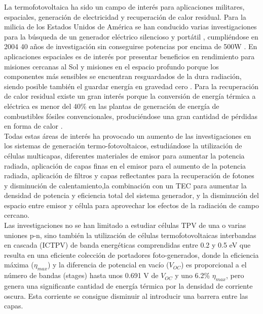La termofotovoltaica ha sido un campo de interés para aplicaciones militares, espaciales, generación de electricidad y recuperación de calor residual. Para la milicia de los Estados Unidos de América se han conducido varias investigaciones para la búsqueda de un generador eléctrico silencioso y portátil \cite{military_TPV}, cumpliéndose en 2004 40 años de investigación sin conseguirse potencias por encima de 500W \cite{military_TPV_40Years}. En aplicaciones espaciales es de interés por presentar beneficios en rendimiento para misiones cercanas al Sol y misiones en el espacio profundo porque los componentes más sensibles se encuentran resguardados de la dura radiación, siendo posible también el guardar energía en gravedad cero \cite{TPV_space_applications}. Para la recuperación de calor residual existe un gran interés porque la conversión de energía térmica a eléctrica es menor del 40\% en las plantas de generación de energía de combustibles fósiles convencionales, produciéndose una gran cantidad de pérdidas en forma de calor \cite{wasteHeat_TPV}.\\

Todas estas áreas de interés ha provocado un aumento de las investigaciones en los sistemas de generación termo-fotovoltaicos, estudiándose la utilización de células multicapas, diferentes materiales de emisor para aumentar la potencia radiada, aplicación de capas finas en el emisor para el aumento de la potencia radiada\cite{doi:Near_field_ThinFilm}, aplicación de filtros \cite{multiLayerFilters} y capas reflectantes para la recuperación de fotones y disminución de calentamiento\cite{thermoionic_TPV_NF},la combinación con un TEC para aumentar la densidad de potencia y eficiencia total del sistema generador\cite{thermoionic_TPV_NF,progress_Thermoionic_TPV}, y la disminución del espacio entre emisor y célula para aprovechar los efectos de la radiación de campo cercano\cite{thermoionic_TPV_NF,modelEfficiency_NF_TPV,nf_TPV_Pillars_SiO2}.\\

Las investigaciones no se han limitado a estudiar células TPV de una o varias uniones p-n, sino también la utilización de células termofotovoltaicas interbandas en cascada (ICTPV) de banda energéticas comprendidas entre 0.2 y 0.5 eV que resulta en una eficiente colección de portadores foto-generados, donde la eficiencia máxima ($\eta_{max}$) y la diferencia de potencial en vacío ($V_{OC}$) es proporcional a el número de bandas (stages) hasta unos 0.691 V de $V_{OC}$ y uno 6.2\% $\eta_{max}$, pero genera una significante cantidad de energía térmica por la densidad de corriente oscura\cite{MultiEstados_Capas_TPVs}. Esta corriente se consigue disminuir al introducir una barrera entre las capas\cite{decreaseDarkCurrent}.\\

